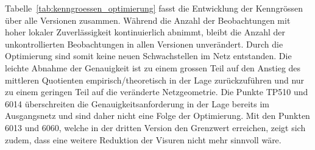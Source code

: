 Tabelle~\ref{tab:kenngroessen_optimierung} fasst die Entwicklung der Kenngrössen über alle Versionen zusammen.
Während die Anzahl der Beobachtungen mit hoher lokaler Zuverlässigkeit kontinuierlich abnimmt, bleibt die Anzahl
der unkontrollierten Beobachtungen in allen Versionen unverändert. Durch die Optimierung sind somit keine neuen
Schwachstellen im Netz entstanden. Die leichte Abnahme der Genauigkeit ist zu einem grossen Teil auf den Anstieg
des mittleren Quotienten empirisch/theoretisch in der Lage zurückzuführen und nur zu einem geringen Teil auf die
veränderte Netzgeometrie. Die Punkte TP510 und 6014 überschreiten die Genauigkeitsanforderung in der Lage bereits im
Ausgangsnetz und sind daher nicht eine Folge der Optimierung. Mit den Punkten 6013 und 6060, welche in der dritten
Version den Grenzwert erreichen, zeigt sich zudem, dass eine weitere Reduktion der Visuren nicht mehr sinnvoll wäre.
\clearpage
